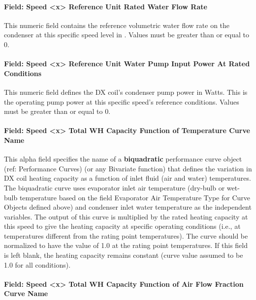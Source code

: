 \paragraph{Field: Speed \textless{}x\textgreater{} Reference Unit Rated Water Flow Rate}\label{vshpwhheating-speed-x-reference-unit-rated-water-flow-rate}
This numeric field contains the reference volumetric water flow rate on the condenser at this specific speed level in \si{\volumeFlowRate}. Values must be greater than or equal to 0.


\paragraph{Field: Speed \textless{}x\textgreater{} Reference Unit Water Pump Input Power At Rated Conditions}\label{vshpwhheating-speed-x-reference-unit-water-pump-input-power-at-rated-conditions}

This numeric field defines the DX coil's condenser pump power in Watts. This is the operating pump power at this specific speed's reference conditions.
Values must be greater than or equal to 0.


\paragraph{Field: Speed \textless{}x\textgreater{} Total WH Capacity Function of Temperature Curve Name}\label{vshpwhheating-speed-x-total-wh-capacity-function-of-temperature-curve-name}

This alpha field specifies the name of a \textbf{biquadratic} performance curve object (ref: Performance Curves) (or any Bivariate function) that defines the variation in DX coil heating capacity as a function of inlet fluid (air and water) temperatures.
The biquadratic curve uses evaporator inlet air temperature (dry-bulb or wet-bulb temperature based on the field Evaporator Air Temperature Type for Curve Objects defined above) and condenser inlet water temperature as the independent variables.
The output of this curve is multiplied by the rated heating capacity at this speed to give the heating capacity at specific operating conditions (i.e., at temperatures different from the rating point temperatures). The curve should be normalized to have the value of 1.0 at the rating point temperatures.
If this field is left blank, the heating capacity remains constant (curve value assumed to be 1.0 for all conditions).

\paragraph{Field: Speed \textless{}x\textgreater{} Total WH Capacity Function of Air Flow Fraction Curve Name}\label{vshpwhheating-speed-x-total-wh-capacity-function-of-air-flow-fraction-curve-name}


